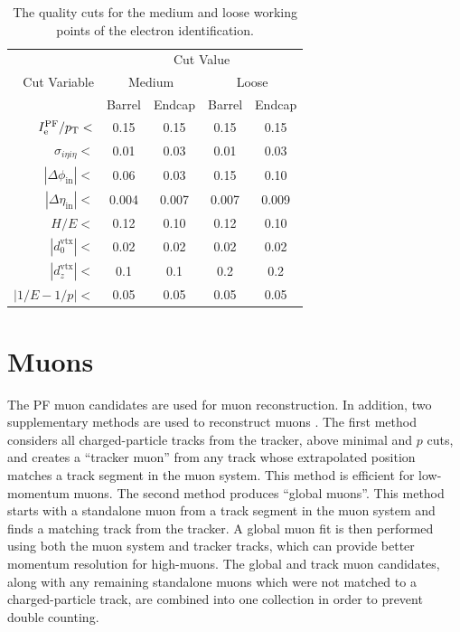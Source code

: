 \begin{table}[htb]
  \begin{center}
    \begin{tabular}{|r|c|c|c|c|}
      \hline
      \multirow{3}{*}{Cut Variable} & \multicolumn{4}{|c|}{Cut Value} \\
      \cline{2-5}
                                    & \multicolumn{2}{|c|}{Medium} & \multicolumn{2}{|c|}{Loose} \\
      \cline{2-5}
                                    & Barrel & Endcap & Barrel  & Endcap    \\
      \hline
      $I^{\text{PF}}_{\mathrm{e}}/p_{\mathrm{T}}<$    & 0.15     & 0.15     & 0.15      & 0.15      \\      
      $\sigma_{i\eta i\eta}<$       & 0.01     & 0.03     & 0.01      & 0.03    \\ 
      $|\Delta\phi_{\text{in}}|<$   & 0.06     & 0.03     & 0.15      & 0.10    \\ 
      $|\Delta\eta_{\text{in}}|<$   & 0.004    & 0.007    & 0.007     & 0.009    \\ 
      $H/E<$                        & 0.12     & 0.10     & 0.12      & 0.10     \\ 
      $|d_0^{\text{vtx}}|<$         & 0.02     & 0.02     & 0.02      & 0.02     \\              
      $|d_z^{\text{vtx}}|<$         & 0.1      & 0.1      & 0.2       & 0.2      \\              
      $|1/E - 1/p|<$                & 0.05     & 0.05     & 0.05      & 0.05     \\
      \hline
    \end{tabular}
    \caption{The quality cuts for the medium and loose working points of the electron identification. }
    \label{tab:eleWP}
  \end{center}
\end{table}

\section{Muons
\label{sec:muon-reco}}

The PF muon candidates are used for muon reconstruction. In addition, two supplementary methods are used to reconstruct muons \cite{CMS-PAS-MUO-10-002}. The first method considers all charged-particle tracks from the tracker, above minimal \pt and $p$ cuts, and creates a ``tracker muon'' from any track whose extrapolated position matches a track segment in the muon system. This method is efficient for low-momentum muons. The second method produces ``global muons''. This method starts with a standalone muon from a track segment in the muon system and finds a matching track from the tracker. A global muon fit is then performed using both the muon system and tracker tracks, which can provide better momentum resolution for high-\pt muons. The global and track muon candidates, along with any remaining standalone muons which were not matched to a charged-particle track, are combined into one collection in order to prevent double counting.

